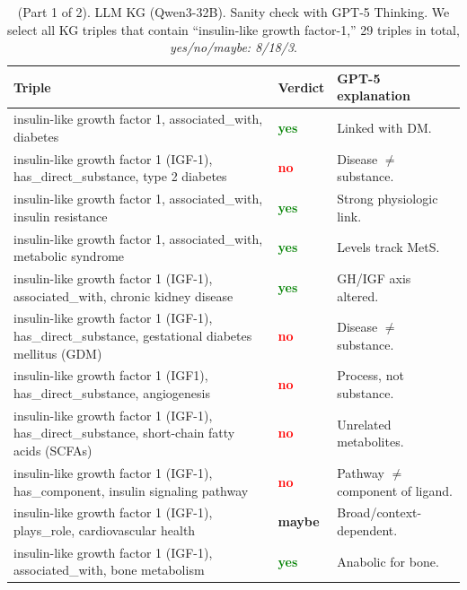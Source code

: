 \documentclass[10pt]{article}
\begin{document}
\begin{appendices}
\begin{table}[t]
\centering
\caption{(Part 1 of 2). LLM KG (Qwen3-32B). Sanity check with GPT-5 Thinking. We select all KG triples that contain ``insulin-like growth factor-1,'' 29 triples in total, \emph{yes/no/maybe: 8/18/3}.}
\label{tab:llm_triples-check-igf}
\begin{tabularx}{\linewidth}{
  >{\hsize=1.3\hsize\raggedright\arraybackslash}X  %
  p{3em}                                           %
  >{\hsize=0.7\hsize\raggedright\arraybackslash}X  %
}
\rowcolor{gray!30}
\textbf{Triple} & \textbf{Verdict} & \textbf{GPT-5 explanation} \\
\midrule
insulin-like growth factor 1, associated\_with, diabetes & \textcolor{Green}{\bf yes} & Linked with DM. \\
insulin-like growth factor 1 (IGF-1), has\_direct\_substance, type 2 diabetes & \textcolor{red}{\bf no} & Disease $\neq$ substance. \\
insulin-like growth factor 1, associated\_with, insulin resistance & \textcolor{Green}{\bf yes} & Strong physiologic link. \\
insulin-like growth factor 1, associated\_with, metabolic syndrome & \textcolor{Green}{\bf yes} & Levels track MetS. \\
insulin-like growth factor 1 (IGF-1), associated\_with, chronic kidney disease & \textcolor{Green}{\bf yes} & GH/IGF axis altered. \\
insulin-like growth factor 1 (IGF-1), has\_direct\_substance, gestational diabetes mellitus (GDM) & \textcolor{red}{\bf no} & Disease $\neq$ substance. \\
insulin-like growth factor 1 (IGF1), has\_direct\_substance, angiogenesis & \textcolor{red}{\bf no} & Process, not substance. \\
insulin-like growth factor 1 (IGF-1), has\_direct\_substance, short-chain fatty acids (SCFAs) & \textcolor{red}{\bf no} & Unrelated metabolites. \\
insulin-like growth factor 1 (IGF-1), has\_component, insulin signaling pathway & \textcolor{red}{\bf no} & Pathway $\neq$ component of ligand. \\
insulin-like growth factor 1 (IGF-1), plays\_role, cardiovascular health & \textcolor{YellowOrange}{\bf maybe} & Broad/context-dependent. \\
insulin-like growth factor 1 (IGF-1), associated\_with, bone metabolism & \textcolor{Green}{\bf yes} & Anabolic for bone. \\

\end{tabularx}
\end{table}
\end{appendices}
\end{document}
